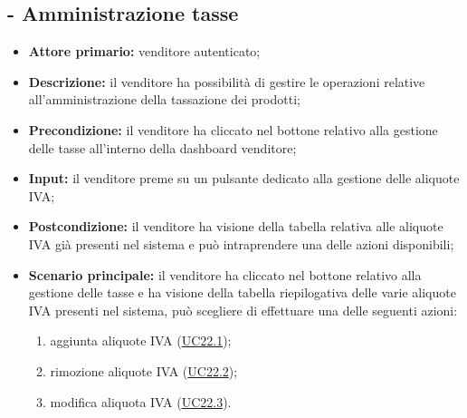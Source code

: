 \stepUserCase
\subsection{ - Amministrazione tasse}
\begin{itemize}
    \item \textbf{Attore primario:} venditore autenticato;
    \item \textbf{Descrizione:} il venditore ha possibilità di gestire le operazioni relative all’amministrazione della tassazione dei prodotti;
    \item \textbf{Precondizione:} il venditore ha cliccato nel bottone relativo alla gestione delle tasse all’interno della dashboard venditore;
    \item \textbf{Input:} il venditore preme su un pulsante dedicato alla gestione delle aliquote IVA;
    \item \textbf{Postcondizione:} il venditore ha visione della tabella relativa alle aliquote IVA già presenti nel sistema e può intraprendere una delle azioni disponibili;
    \item \textbf{Scenario principale:} il venditore ha cliccato nel bottone relativo alla gestione delle tasse e ha visione della tabella riepilogativa delle varie aliquote IVA presenti nel sistema, può scegliere di effettuare una delle seguenti azioni:
          \begin{enumerate}
              \item aggiunta aliquote IVA (\hyperref[UC22.1]{UC22.1});
              \item rimozione aliquote IVA (\hyperref[UC22.2]{UC22.2});
              \item modifica aliquota IVA (\hyperref[UC22.3]{UC22.3}).
          \end{enumerate}
\end{itemize}

\stepsubUserCase
